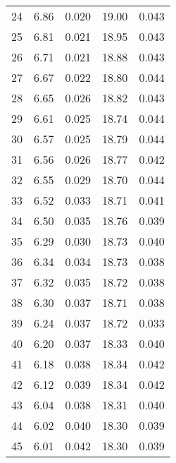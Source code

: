 \begin{table}
\begin{tabular}{c|ll|ll}
24 & 6.86 & 0.020 & 19.00 & 0.043 \\
25 & 6.81 & 0.021 & 18.95 & 0.043 \\
26 & 6.71 & 0.021 & 18.88 & 0.043 \\
27 & 6.67 & 0.022 & 18.80 & 0.044 \\
28 & 6.65 & 0.026 & 18.82 & 0.043 \\
29 & 6.61 & 0.025 & 18.74 & 0.044 \\
30 & 6.57 & 0.025 & 18.79 & 0.044 \\
31 & 6.56 & 0.026 & 18.77 & 0.042 \\
32 & 6.55 & 0.029 & 18.70 & 0.044 \\
33 & 6.52 & 0.033 & 18.71 & 0.041 \\
34 & 6.50 & 0.035 & 18.76 & 0.039 \\
35 & 6.29 & 0.030 & 18.73 & 0.040 \\
36 & 6.34 & 0.034 & 18.73 & 0.038 \\
37 & 6.32 & 0.035 & 18.72 & 0.038 \\
38 & 6.30 & 0.037 & 18.71 & 0.038 \\
39 & 6.24 & 0.037 & 18.72 & 0.033 \\
40 & 6.20 & 0.037 & 18.33 & 0.040 \\
41 & 6.18 & 0.038 & 18.34 & 0.042 \\
42 & 6.12 & 0.039 & 18.34 & 0.042 \\
43 & 6.04 & 0.038 & 18.31 & 0.040 \\
44 & 6.02 & 0.040 & 18.30 & 0.039 \\
45 & 6.01 & 0.042 & 18.30 & 0.039 \\
               \hline
        \end{tabular}
    \end{table}
    \clearpage

